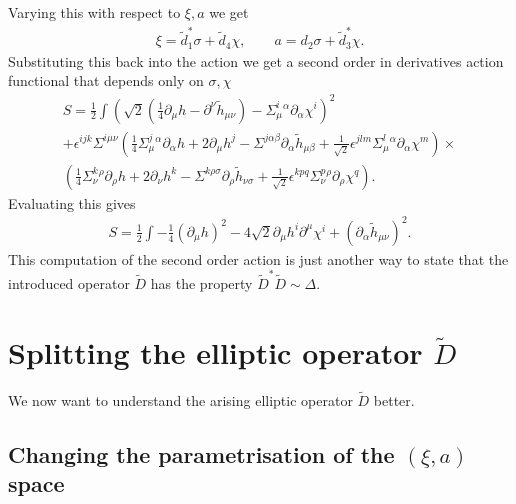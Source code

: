 \documentclass[10pt]{report}
\theoremstyle{definition}
\begin{document}
Varying this with respect to $\xi, a$ we get
\begin{align}
\xi = \tilde{d}_1^* \sigma+ \tilde{d}_4 \chi, \qquad a = d_2\sigma+ \tilde{d}_3^* \chi. 
\end{align}
Substituting this back into the action we get a second order in derivatives action functional that depends only on $\sigma, \chi$
\begin{align}\nonumber
S= \frac{1}{2} \int \left(\sqrt{2}( \frac{1}{4} \partial_\mu h -  \partial^\nu \tilde{h}_{\mu\nu})- \Sigma^i_\mu{}^\alpha \partial_\alpha \chi^i \right)^2 \\ \nonumber
+ \epsilon^{ijk} \Sigma^{i\mu\nu} ( \frac{1}{4} \Sigma^j_\mu{}^\alpha \partial_\alpha h +2 \partial_\mu h^j -  \Sigma^{j\alpha\beta} \partial_\alpha \tilde{h}_{\mu\beta} + \frac{1}{\sqrt{2}} \epsilon^{jlm} \Sigma^l_\mu{}^\alpha \partial_\alpha \chi^m)\times \\ \nonumber
( \frac{1}{4} \Sigma^k_\nu{}^\rho \partial_\rho h +2 \partial_\nu h^k -  \Sigma^{k\rho\sigma} \partial_\rho \tilde{h}_{\nu\sigma} + \frac{1}{\sqrt{2}} \epsilon^{kpq} \Sigma^p_\nu{}^\rho \partial_\rho \chi^q).
\end{align}
Evaluating this gives
\begin{align}\label{sec-order-action}
S=\frac{1}{2} \int - \frac{1}{4} (\partial_\mu h)^2 - 4\sqrt{2} \partial_\mu h^i \partial^\mu \chi^i + ( \partial_\alpha \tilde{h}_{\mu\nu})^2.
\end{align}
This computation of the second order action is just another way to state that the introduced operator $\tilde{D}$ has the property $\tilde{D}^* \tilde{D}\sim \Delta$.

\section{Splitting the elliptic operator \texorpdfstring{$\tilde{D}$}{}}

We now want to understand the arising elliptic operator $\tilde{D}$ better. 

\subsection{Changing the parametrisation of the \texorpdfstring{$(\xi,a)$}{} space}
\end{document}
